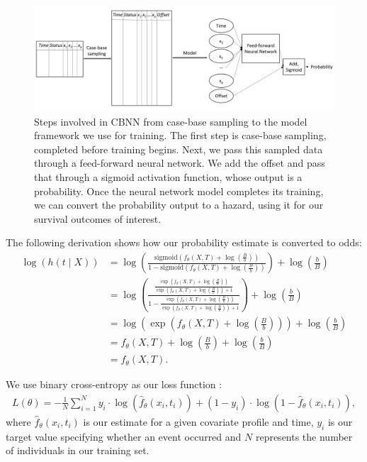 \documentclass[AMA,STIX1COL,]{WileyNJD-v2}
\begin{document}
\begin{figure}

{\centering \includegraphics[width=1\linewidth]{../figures/nnarch2} 

}

\caption{Steps involved in CBNN from case-base sampling to the model framework we use for training. The first step is case-base sampling, completed before training begins. Next, we pass this sampled data through a feed-forward neural network. We add the offset and pass that through a sigmoid activation function, whose output is a probability. Once the neural network model completes its training, we can convert the probability output to a hazard, using it for our survival outcomes of interest.}\label{fig:NNarch}
\end{figure}

The following derivation shows how our probability estimate is converted
to odds: \begin{align*}
 \log\left( h(t \mid X) \right) &= \log\left(\frac{\mathrm{sigmoid}\left(f_{\theta}(X, T) + \log\left(\frac{B}{b}\right)\right)}{1-\mathrm{sigmoid}\left(f_{\theta}(X, T) + \log\left(\frac{B}{b}\right)\right)}\right) + \log\left(\frac{b}{B}\right) \\
 &= \log\left( \frac{\frac{\exp\left(f_{\theta}(X, T) + \log\left(\frac{B}{b}\right)\right)}{\exp\left(f_{\theta}(X, T) + \log\left(\frac{B}{b}\right)\right)+1}}{1-\frac{\exp\left(f_{\theta}(X, T) + \log\left(\frac{B}{b}\right)\right)}{\exp\left(f_{\theta}(X, T) + \log\left(\frac{B}{b}\right)\right)+1}}\right) + \log\left(\frac{b}{B}\right) \\
 &= \log\left(\exp\left( f_{\theta}(X, T) + \log\left(\frac{B}{b}\right) \right) \right) + \log\left(\frac{b}{B}\right) \\
 &= f_{\theta}(X, T) + \log\left(\frac{B}{b}\right) + \log\left(\frac{b}{B}\right) \\
&= f_{\theta}(X, T). 
\end{align*}

We use binary cross-entropy as our loss function \citep{gulli2017}:
\begin{align*}
L(\theta)=-\frac{1}{N} \sum^{N}_{i=1} y_{i} \cdot \log(\hat{f}_{\theta}(x_{i}, t_{i}) ) + (1-y_{i} )\cdot \log(1-\hat{f}_{\theta}(x_{i}, t_{i}) ),
\end{align*} where \(\hat{f}_{\theta}(x_{i}, t_{i})\) is our estimate
for a given covariate profile and time, \(y_{i}\) is our target value
specifying whether an event occurred and \(N\) represents the number of
individuals in our training set.
\end{document}
